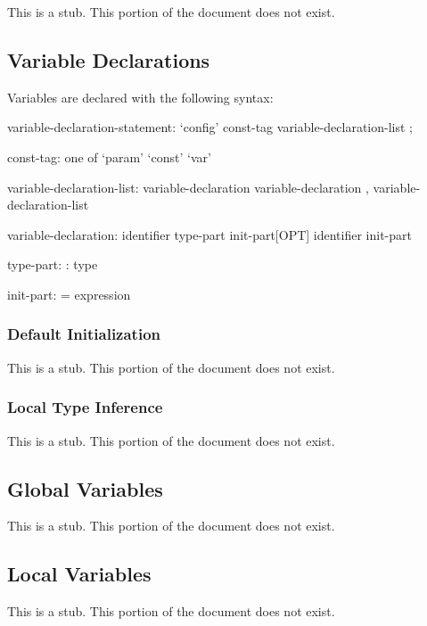 \label{Variables}

This is a stub.  This portion of the document does not exist.

\subsection{Variable Declarations}
\label{Variable_Declarations}

Variables are declared with the following syntax:
\begin{syntax}
variable-declaration-statement:
  `config' const-tag variable-declaration-list ;

const-tag: one of
  `param' `const' `var'

variable-declaration-list:
  variable-declaration
  variable-declaration , variable-declaration-list

variable-declaration:
  identifier type-part init-part[OPT]
  identifier init-part

type-part:
  : type

init-part:
  = expression
\end{syntax}

\subsubsection{Default Initialization}
\label{Default_Initialization}

This is a stub.  This portion of the document does not exist.

\subsubsection{Local Type Inference}
\label{Local_Type_Inference}

This is a stub.  This portion of the document does not exist.

\subsection{Global Variables}
\label{Global_Variables}

This is a stub.  This portion of the document does not exist.

\subsection{Local Variables}
\label{Local_Variables}

This is a stub.  This portion of the document does not exist.

